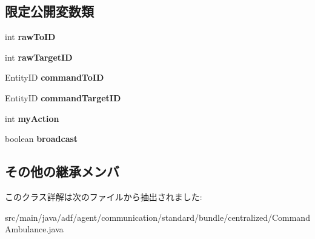 \subsection*{限定公開変数類}
\begin{DoxyCompactItemize}
\item 
\hypertarget{classadf_1_1agent_1_1communication_1_1standard_1_1bundle_1_1centralized_1_1CommandAmbulance_a97e8b4990f2dc4993cf7a5d688ba75d0}{}\label{classadf_1_1agent_1_1communication_1_1standard_1_1bundle_1_1centralized_1_1CommandAmbulance_a97e8b4990f2dc4993cf7a5d688ba75d0} 
int {\bfseries raw\+To\+ID}
\item 
\hypertarget{classadf_1_1agent_1_1communication_1_1standard_1_1bundle_1_1centralized_1_1CommandAmbulance_aa4f86ac3f5617b3f738a04f0a53f12ea}{}\label{classadf_1_1agent_1_1communication_1_1standard_1_1bundle_1_1centralized_1_1CommandAmbulance_aa4f86ac3f5617b3f738a04f0a53f12ea} 
int {\bfseries raw\+Target\+ID}
\item 
\hypertarget{classadf_1_1agent_1_1communication_1_1standard_1_1bundle_1_1centralized_1_1CommandAmbulance_aaf63382e49a330ea42fd060dfdff00a2}{}\label{classadf_1_1agent_1_1communication_1_1standard_1_1bundle_1_1centralized_1_1CommandAmbulance_aaf63382e49a330ea42fd060dfdff00a2} 
Entity\+ID {\bfseries command\+To\+ID}
\item 
\hypertarget{classadf_1_1agent_1_1communication_1_1standard_1_1bundle_1_1centralized_1_1CommandAmbulance_a98e8a6ff76f44059b4ac618081b27dbe}{}\label{classadf_1_1agent_1_1communication_1_1standard_1_1bundle_1_1centralized_1_1CommandAmbulance_a98e8a6ff76f44059b4ac618081b27dbe} 
Entity\+ID {\bfseries command\+Target\+ID}
\item 
\hypertarget{classadf_1_1agent_1_1communication_1_1standard_1_1bundle_1_1centralized_1_1CommandAmbulance_a7a1d5eabbf6f39432b1ffef0ec43c8b2}{}\label{classadf_1_1agent_1_1communication_1_1standard_1_1bundle_1_1centralized_1_1CommandAmbulance_a7a1d5eabbf6f39432b1ffef0ec43c8b2} 
int {\bfseries my\+Action}
\item 
\hypertarget{classadf_1_1agent_1_1communication_1_1standard_1_1bundle_1_1centralized_1_1CommandAmbulance_aa5ea84c7be093e98ffc7268a934c416d}{}\label{classadf_1_1agent_1_1communication_1_1standard_1_1bundle_1_1centralized_1_1CommandAmbulance_aa5ea84c7be093e98ffc7268a934c416d} 
boolean {\bfseries broadcast}
\end{DoxyCompactItemize}
\subsection*{その他の継承メンバ}


このクラス詳解は次のファイルから抽出されました\+:\begin{DoxyCompactItemize}
\item 
src/main/java/adf/agent/communication/standard/bundle/centralized/Command\+Ambulance.\+java\end{DoxyCompactItemize}

